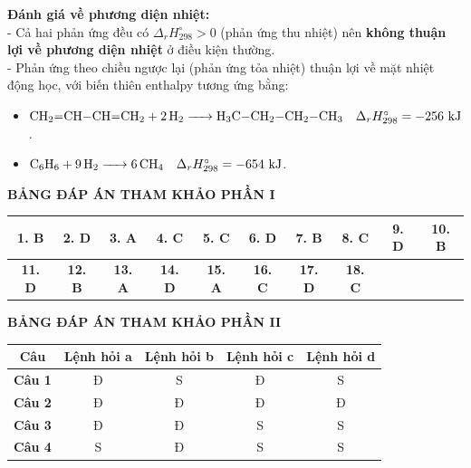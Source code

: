 \documentclass[12pt,a4paper]{article}
\begin{document}
\begin{ex}
{\textbf{Đánh giá về phương diện nhiệt:}\\
- Cả hai phản ứng đều có $\Delta_r H^\circ_{298} > 0$ (phản ứng thu nhiệt) nên \textbf{không thuận lợi về phương diện nhiệt} ở điều kiện thường.\\
- Phản ứng theo chiều ngược lại (phản ứng tỏa nhiệt) thuận lợi về mặt nhiệt động học, với biến thiên enthalpy tương ứng bằng:
\begin{itemize}
    \item $\ce{CH2=CH-CH=CH2 + 2H2 -> H3C-CH2-CH2-CH3} \quad \Delta_r H^\circ_{298} = -256\text{ kJ}$.
    \item $\ce{C6H6 + 9H2 -> 6CH4} \quad \Delta_r H^\circ_{298} = -654\text{ kJ}$.
\end{itemize}
}

\end{ex}

\bigskip
\newpage
\noindent\textbf{\large BẢNG ĐÁP ÁN THAM KHẢO PHẦN I}
\vspace{0.2cm}

\noindent
\begin{center}
\begin{tabular}{|c|c|c|c|c|c|c|c|c|c|}
\hline
\textbf{1. B} & \textbf{2. D} & \textbf{3. A} & \textbf{4. C} & \textbf{5. C} & \textbf{6. D} & \textbf{7. B} & \textbf{8. C} & \textbf{9. D} & \textbf{10. B} \\
\hline
\textbf{11. D} & \textbf{12. B} & \textbf{13. A} & \textbf{14. D} & \textbf{15. A} & \textbf{16. C} & \textbf{17. D} & \textbf{18. C} & & \\
\hline
\end{tabular}
\end{center}

\bigskip
\noindent\textbf{\large BẢNG ĐÁP ÁN THAM KHẢO PHẦN II}
\vspace{0.2cm}

\noindent
\begin{center}
\begin{tabular}{|c|c|c|c|c|}
\hline
\textbf{Câu} & \textbf{Lệnh hỏi a} & \textbf{Lệnh hỏi b} & \textbf{Lệnh hỏi c} & \textbf{Lệnh hỏi d} \\
\hline
\textbf{Câu 1} & Đ & S & Đ & S \\
\hline
\textbf{Câu 2} & Đ & Đ & Đ & Đ \\
\hline
\textbf{Câu 3} & Đ & Đ & S & S \\
\hline
\textbf{Câu 4} & S & Đ & S & S \\
\hline
\end{tabular}
\end{center}
\end{document}
